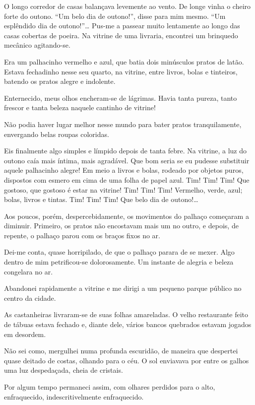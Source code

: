 O longo corredor de casas balançava levemente ao vento. De longe vinha o cheiro forte do outono. ``Um belo dia de outono!'', disse para mim mesmo. ``Um esplêndido dia de outono!''\dots
Pus-me a passear muito lentamente ao longo das casas cobertas de poeira. Na vitrine de uma livraria, encontrei um brinquedo mecânico agitando-se.

Era um palhacinho vermelho e azul, que batia dois minúsculos pratos de latão. Estava fechadinho nesse seu quarto, na vitrine, entre livros, bolas e tinteiros, batendo os pratos alegre e indolente.

Enternecido, meus olhos encheram-se de lágrimas. Havia tanta pureza, tanto frescor e tanta beleza naquele cantinho de vitrine!

Não podia haver lugar melhor nesse mundo para bater pratos tranquilamente, envergando belas roupas coloridas.

Eis finalmente algo simples e límpido depois de tanta febre. Na vitrine, a luz do outono caía mais íntima, mais agradável. Que bom seria se eu pudesse substituir aquele palhacinho alegre! Em meio a livros e bolas, rodeado por objetos puros, dispostos com esmero em cima de uma folha de papel azul. Tim! Tim! Tim! Que gostoso, que gostoso é estar na vitrine! Tim! Tim! Tim! Vermelho, verde, azul; bolas, livros e tintas. Tim! Tim! Tim! Que belo dia de outono!\dots

Aos poucos, porém, despercebidamente, os movimentos do palhaço começaram a diminuir. Primeiro, os pratos não encostavam mais um no outro, e depois, de repente, o palhaço parou com os braços fixos no ar.

Dei-me conta, quase horripilado, de que o palhaço parara de se mexer. Algo dentro de mim petrificou-se dolorosamente. Um instante de alegria e beleza congelara no ar.

Abandonei rapidamente a vitrine e me dirigi a um pequeno parque público no centro da cidade.

As castanheiras livraram-se de suas folhas amareladas. O velho restaurante feito de tábuas estava fechado e, diante dele, vários bancos quebrados estavam jogados em desordem.

Não sei como, mergulhei numa profunda escuridão, de maneira que despertei quase deitado de costas, olhando para o céu. O sol enviavava por entre os galhos uma luz despedaçada, cheia de cristais.

Por algum tempo permaneci assim, com olhares perdidos para o alto, enfraquecido, indescritivelmente enfraquecido.

